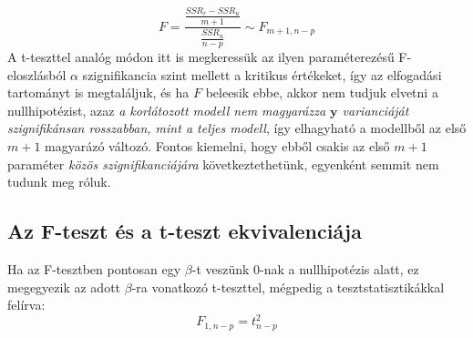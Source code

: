\documentclass[14p]{report}
\def\pmb{\boldsymbol}
\begin{document}
	\[
		F = \frac{\frac{SSR_r - SSR_u}{m+1}}{\frac{SSR_u}{n-p}} \sim F_{m+1,n-p}
	\]
	A t-teszttel analóg módon itt is megkeressük az ilyen paraméterezésű F-eloszlásból $\alpha$ szignifikancia szint mellett a kritikus értékeket, így az elfogadási tartományt is megtaláljuk, és ha $F$ beleesik ebbe, akkor nem tudjuk elvetni a nullhipotézist, azaz \emph{a korlátozott modell nem magyarázza $\pmb{y}$ varianciáját szignifikánsan rosszabban, mint a teljes modell}, így elhagyható a modellből az első $m+1$ magyarázó változó. Fontos kiemelni, hogy ebből csakis az első $m+1$ paraméter \emph{közös szignifikanciájára} következtethetünk, egyenként semmit nem tudunk meg róluk.
	\subsection{Az F-teszt és a t-teszt ekvivalenciája}
	Ha az F-tesztben pontosan egy $\beta$-t veszünk $0$-nak a nullhipotézis alatt, ez megegyezik az adott $\beta$-ra vonatkozó t-teszttel, mégpedig a tesztstatisztikákkal felírva:
	\[
		F_{1,n-p} = t^2_{n-p}
	\]
	
\end{document}
